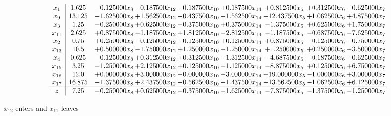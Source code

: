\documentclass[10pt]{article}
\begin{document}
 \[\begin{array}{c| c c@{\hskip 2pt} c@{\hskip 2pt} c@{\hskip 2pt} c@{\hskip 2pt} c@{\hskip 2pt} c@{\hskip 2pt} c@{\hskip 2pt} }
 x_{1}   &  1.625 & -0.125000 x_{8} & -0.187500 x_{12} & -0.187500 x_{10} & + 0.187500 x_{14} & + 0.812500 x_{5} & + 0.312500 x_{6} & -0.625000 x_{7}\\
 x_{9}   &  13.125 & -1.625000 x_{8} & + 1.562500 x_{12} & -0.437500 x_{10} & -1.562500 x_{14} & -12.437500 x_{5} & + 1.062500 x_{6} & + 4.875000 x_{7}\\
 x_{3}   &  1.25 & -0.250000 x_{8} & + 0.625000 x_{12} & -0.375000 x_{10} & + 0.375000 x_{14} & -1.375000 x_{5} & + 0.625000 x_{6} & + 1.750000 x_{7}\\
 x_{11}   &  2.625 & + 0.875000 x_{8} & -1.187500 x_{12} & + 1.812500 x_{10} & -2.812500 x_{14} & -1.187500 x_{5} & -0.687500 x_{6} & -7.625000 x_{7}\\
 x_{2}   &  0.75 & + 0.250000 x_{8} & -0.125000 x_{12} & -0.125000 x_{10} & + 0.125000 x_{14} & + 0.875000 x_{5} & -0.125000 x_{6} & -0.750000 x_{7}\\
 x_{13}   &  10.5 & + 0.500000 x_{8} & -1.750000 x_{12} & + 1.250000 x_{10} & -1.250000 x_{14} & + 1.250000 x_{5} & + 0.250000 x_{6} & -3.500000 x_{7}\\
 x_{4}   &  0.625 & -0.125000 x_{8} & + 0.312500 x_{12} & + 0.312500 x_{10} & -1.312500 x_{14} & -4.687500 x_{5} & -0.187500 x_{6} & -0.625000 x_{7}\\
 x_{15}   &  3.25 & -1.250000 x_{8} & + 2.125000 x_{12} & + 0.125000 x_{10} & -1.125000 x_{14} & -8.875000 x_{5} & + 0.125000 x_{6} & + 6.750000 x_{7}\\
 x_{16}   &  12.0 & + 0.000000 x_{8} & + 3.000000 x_{12} & -0.000000 x_{10} & -3.000000 x_{14} & -19.000000 x_{5} & -1.000000 x_{6} & + 3.000000 x_{7}\\
 x_{17}   &  16.875 & -1.375000 x_{8} & + 2.437500 x_{12} & -0.562500 x_{10} & -1.437500 x_{14} & -13.562500 x_{5} & -1.062500 x_{6} & + 6.125000 x_{7}\\
\hline
z    &  7.25 & -0.250000 x_{8} & + 0.625000 x_{12} & -0.375000 x_{10} & -1.625000 x_{14} & -7.375000 x_{5} & -1.375000 x_{6} & -1.250000 x_{7}\\
\end{array}\]


 $ x_{12} $ enters and $ x_{11} $ leaves 
\end{document}
